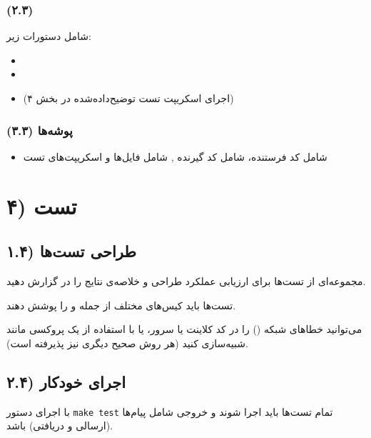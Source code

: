 \subsubsection*{(۲.۳) }
شامل دستورات زیر:
\begin{itemize}
  \item \texttt {}
  \item \texttt {}
  \item \texttt {} (اجرای اسکریپت تست توضیح‌داده‌شده در بخش ۴)
\end{itemize}

\subsubsection*{(۳.۳) پوشه‌ها}
\begin{itemize}
  \item {} شامل کد فرستنده،  شامل کد گیرنده ,  شامل فایل‌ها و اسکریپت‌های تست
\end{itemize}

\section*{۴) تست}

\subsection*{۱.۴) طراحی تست‌ها}
مجموعه‌ای از تست‌ها برای ارزیابی عملکرد طراحی و خلاصه‌ی نتایج را در  گزارش دهید.

تست‌ها باید کیس‌های مختلف از جمله  و  را پوشش دهند.

می‌توانید خطاهای شبکه () را در کد کلاینت یا سرور، 
یا با استفاده از یک پروکسی مانند  شبیه‌سازی کنید 
(هر روش صحیح دیگری نیز پذیرفته است).

\subsection*{۲.۴) اجرای خودکار}
با اجرای دستور \texttt{make test} تمام تست‌ها باید اجرا شوند و خروجی شامل  پیام‌ها (ارسالی و دریافتی) باشد.
